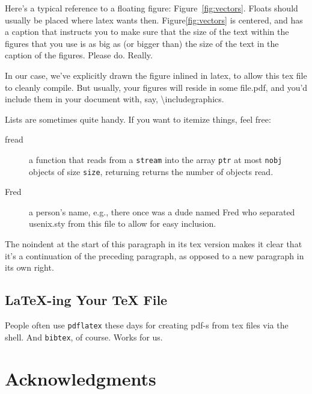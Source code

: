 Here's a typical reference to a floating figure: Figure~\ref{fig:vectors}. Floats should usually be placed where latex wants then. Figure\ref{fig:vectors} is centered, and has a caption that instructs you to make sure that the size of the text within the figures that you use is as big as (or bigger than) the size of the text in the caption of the figures. Please do. Really.\par

In our case, we've explicitly drawn the figure inlined in latex, to allow this tex file to cleanly compile. But usually, your figures will reside in some file.pdf, and you'd include them in your document with, say, \textbackslash{}includegraphics.\par

Lists are sometimes quite handy. If you want to itemize things, feel free:\par

\begin{description}
  
\item[fread] a function that reads from a \texttt{stream} into the array \texttt{ptr} at most \texttt{nobj} objects of size \texttt{size}, returning returns the number of objects read.

\item[Fred] a person's name, e.g., there once was a dude named Fred who separated usenix.sty from this file to allow for easy inclusion.
\end{description}

\noindent
The noindent at the start of this paragraph in its tex version makes it clear that it's a continuation of the preceding paragraph, as opposed to a new paragraph in its own right.\par


\subsection{LaTeX-ing Your TeX File}

People often use \texttt{pdflatex} these days for creating pdf-s from tex files via the shell. And \texttt{bibtex}, of course. Works for us.\par

\section*{Acknowledgments}


